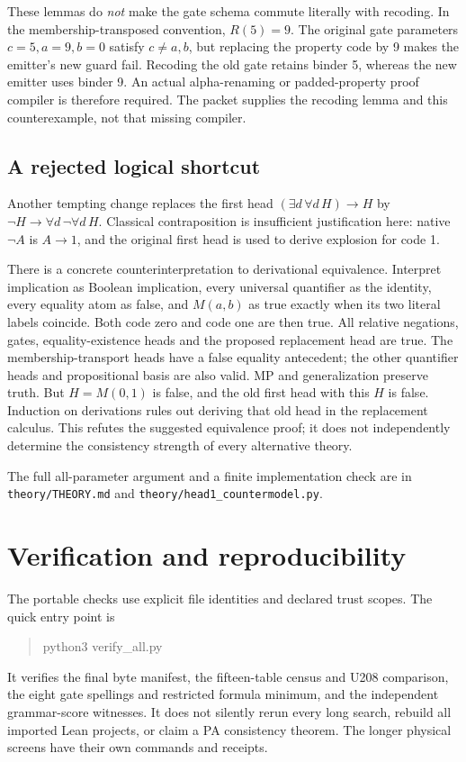 \documentclass[11pt,letterpaper]{article}
\newcommand{\file}[1]{\texttt{\nolinkurl{#1}}}
\newcommand{\imp}{\mathbin{\to}}
\begin{document}
These lemmas do \emph{not} make the gate schema commute literally with
recoding. In the membership-transposed convention, $R(5)=9$. The original
gate parameters $c=5,a=9,b=0$ satisfy $c\ne a,b$, but replacing the property
code by 9 makes the emitter's new guard fail. Recoding the old gate retains
binder 5, whereas the new emitter uses binder 9. An actual alpha-renaming or
padded-property proof compiler is therefore required. The packet supplies
the recoding lemma and this counterexample, not that missing compiler.



\subsection{A rejected logical shortcut}

Another tempting change replaces the first head
$(\exists d\,\forall d\,H)\imp H$ by
$\neg H\imp\forall d\,\neg\forall d\,H$. Classical contraposition is
insufficient justification here: native $\neg A$ is $A\imp1$, and the
original first head is used to derive explosion for code 1.

There is a concrete counterinterpretation to derivational equivalence.
Interpret implication as Boolean implication, every universal quantifier
as the identity, every equality atom as false, and $M(a,b)$ as true exactly
when its two literal labels coincide. Both code zero and code one are then
true. All relative negations, gates, equality-existence heads and the proposed
replacement head are true. The membership-transport heads have a false
equality antecedent; the other quantifier heads and propositional basis are
also valid. MP and generalization preserve truth. But $H=M(0,1)$ is false,
and the old first head with this $H$ is false. Induction on derivations rules
out deriving that old head in the replacement calculus. This refutes the
suggested equivalence proof; it does not independently determine the
consistency strength of every alternative theory.

The full all-parameter argument and a finite implementation check are in
\file{theory/THEORY.md} and \file{theory/head1_countermodel.py}.

\section{Verification and reproducibility}

The portable checks use explicit file identities and declared trust scopes.
The quick entry point is
\begin{quote}\ttfamily
python3 verify\_all.py
\end{quote}
It verifies the final byte manifest, the fifteen-table census and U208
comparison, the eight gate spellings and restricted formula minimum, and the
independent grammar-score witnesses. It does not silently rerun every long
search, rebuild all imported Lean projects, or claim a PA consistency theorem.
The longer physical screens have their own commands and receipts.
\end{document}
